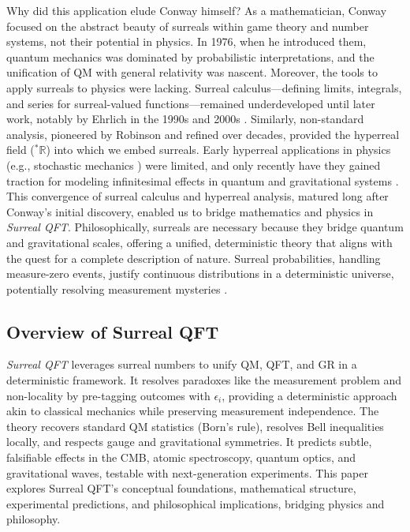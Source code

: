 \documentclass{article}
\begin{document}
Why did this application elude Conway himself? As a mathematician, Conway focused on the abstract beauty of surreals within game theory and number systems, not their potential in physics. In 1976, when he introduced them, quantum mechanics was dominated by probabilistic interpretations, and the unification of QM with general relativity was nascent. Moreover, the tools to apply surreals to physics were lacking. Surreal calculus---defining limits, integrals, and series for surreal-valued functions---remained underdeveloped until later work, notably by Ehrlich in the 1990s and 2000s \cite{Ehrlich2012}. Similarly, non-standard analysis, pioneered by Robinson \cite{Robinson1966} and refined over decades, provided the hyperreal field (\({}^*\mathbb{R}\)) into which we embed surreals. Early hyperreal applications in physics (e.g., stochastic mechanics \cite{Albeverio1986}) were limited, and only recently have they gained traction for modeling infinitesimal effects in quantum and gravitational systems \cite{Goldblatt1998}. This convergence of surreal calculus and hyperreal analysis, matured long after Conway's initial discovery, enabled us to bridge mathematics and physics in \textit{Surreal QFT}. Philosophically, surreals are necessary because they bridge quantum and gravitational scales, offering a unified, deterministic theory that aligns with the quest for a complete description of nature. Surreal probabilities, handling measure-zero events, justify continuous distributions in a deterministic universe, potentially resolving measurement mysteries \cite{Pruss2010}.

\subsection{Overview of Surreal QFT}
\textit{Surreal QFT} leverages surreal numbers to unify QM, QFT, and GR in a deterministic framework. It resolves paradoxes like the measurement problem and non-locality by pre-tagging outcomes with \(\epsilon_i\), providing a deterministic approach akin to classical mechanics while preserving measurement independence. The theory recovers standard QM statistics (Born's rule), resolves Bell inequalities locally, and respects gauge and gravitational symmetries. It predicts subtle, falsifiable effects in the CMB, atomic spectroscopy, quantum optics, and gravitational waves, testable with next-generation experiments. This paper explores Surreal QFT's conceptual foundations, mathematical structure, experimental predictions, and philosophical implications, bridging physics and philosophy.
\end{document}
